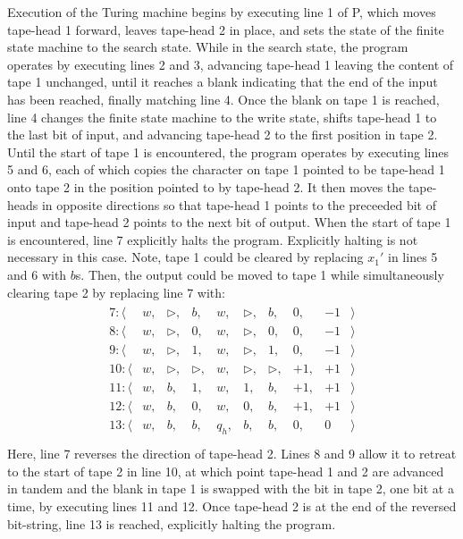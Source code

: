 Execution of the Turing machine begins by executing line 1 of P, which moves tape-head 1 forward, leaves tape-head 2 in place, and sets the state of the finite state machine to the search state. While in the search state, the program operates by executing lines 2 and 3, advancing tape-head 1 leaving the content of tape 1 unchanged, until it reaches a blank indicating that the end of the input has been reached, finally matching line 4.  Once the blank on tape 1 is reached, line 4 changes the finite state machine to the write state, shifts tape-head 1 to the last bit of input, and advancing tape-head 2 to the first position in tape 2.  Until the start of tape 1 is encountered, the program operates by executing lines 5 and 6, each of which copies the character on tape 1 pointed to be tape-head 1 onto tape 2 in the position pointed to by tape-head 2.  It then moves the tape-heads in opposite directions so that tape-head 1 points to the preceeded bit of input and tape-head 2 points to the next bit of output.  When the start of tape 1 is encountered, line 7 explicitly halts the program.   Explicitly halting is not necessary in this case.  Note, tape 1 could be cleared by replacing $x_1'$ in lines 5 and 6 with $b$s.  Then, the output could be moved to tape 1 while simultaneously clearing tape 2 by replacing line 7 with:
\begin{align*}
\begin{array}{rccccccrrrr}     7: \langle&w,& \triangleright,& b,& w,& \triangleright,& b,& 0,& -1&\rangle \\
        8: \langle&w,& \triangleright,& 0,& w,& \triangleright,& 0,& 0,& -1&\rangle \\
        9: \langle&w,& \triangleright,& 1,& w,& \triangleright,& 1,& 0,& -1&\rangle \\
        10: \langle&w,& \triangleright,& \triangleright,& w,& \triangleright,& \triangleright,& +1,& +1&\rangle \\
        11: \langle&w,&  b,& 1,& w,& 1,& b,& +1,& +1&\rangle \\
        12: \langle&w,&  b,& 0,& w,& 0,& b,& +1,& +1&\rangle \\
        13: \langle&w,&  b,& b,& q_h,& b,& b,& 0,& 0&\rangle \\
\end{array}
\end{align*}
Here, line 7 reverses the direction of tape-head 2. Lines 8 and 9 allow it to retreat to the start of tape 2 in line 10, at which point tape-head 1 and 2 are advanced in tandem and the blank in tape 1 is swapped with the bit in tape 2, one bit at a time, by executing lines 11 and 12.  Once tape-head 2 is at the end of the reversed bit-string, line 13 is reached, explicitly halting the program.
        

